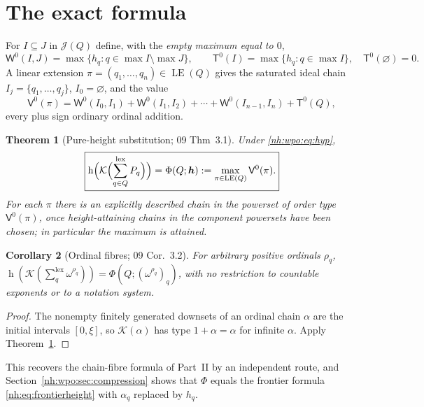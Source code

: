 \documentclass[11pt,a4paper]{article}
\newtheorem{theorem}{Theorem}[section]
\newtheorem{corollary}[theorem]{Corollary}
\theoremstyle{definition}
\theoremstyle{remark}
\newcommand{\K}{\mathcal K}
\newcommand{\hgt}{\operatorname{h}}
\newcommand{\lxs}{\mathop{\sum}\limits^{\mathrm{lex}}}
\newcommand{\J}{\mathcal J}
\newcommand{\LE}{\operatorname{LE}}
\newcommand{\Wz}{\mathsf W^{0}}
\newcommand{\Tz}{\mathsf T^{0}}
\newcommand{\Vz}{\mathsf V^{0}}
\newcommand{\lxsi}{\mathop{\textstyle\sum}\nolimits^{\mathrm{lex}}}
\begin{document}
\section{The exact formula}\label{nh:wpo:sec:statement}

For $I\subseteq J$ in $\J(Q)$ define, with the \emph{empty maximum equal to
$0$},
\begin{equation}\label{nh:wpo:eq:weight}
 \Wz(I,J)=\max\{h_q:q\in\max I\setminus\max J\},\qquad
 \Tz(I)=\max\{h_q:q\in\max I\},\quad \Tz(\varnothing)=0 .
\end{equation}
A linear extension $\pi=(q_1,\dots,q_n)\in\LE(Q)$ gives the saturated ideal
chain $I_j=\{q_1,\dots,q_j\}$, $I_0=\varnothing$, and the value
\begin{equation}\label{nh:wpo:eq:pathvalue}
 \Vz(\pi)=\Wz(I_0,I_1)+\Wz(I_1,I_2)+\cdots+\Wz(I_{n-1},I_n)+\Tz(Q),
\end{equation}
every plus sign ordinary ordinal addition.

\begin{theorem}[Pure-height substitution; 09 Thm~3.1]\label{nh:wpo:thm:main}
Under \eqref{nh:wpo:eq:hyp},
\begin{equation}\label{nh:wpo:eq:main}
 \boxed{\displaystyle
 \hgt\Bigl(\K\Bigl(\lxs_{q\in Q}P_q\Bigr)\Bigr)=\Phi(Q;\boldsymbol h)
 :=\max_{\pi\in\LE(Q)}\Vz(\pi).}
\end{equation}
For each $\pi$ there is an explicitly described chain in the powerset of order
type $\Vz(\pi)$, once height-attaining chains in the component powersets have
been chosen; in particular the maximum is attained.
\end{theorem}

\begin{corollary}[Ordinal fibres; 09 Cor.~3.2]\label{nh:wpo:cor:ordinal}
For arbitrary positive ordinals $\rho_q$,
$\hgt(\K(\lxsi_q\omega^{\rho_q}))=\Phi(Q;(\omega^{\rho_q})_q)$, with no
restriction to countable exponents or to a notation system.
\end{corollary}
\begin{proof}
The nonempty finitely generated downsets of an ordinal chain $\alpha$ are the
initial intervals $[0,\xi]$, so $\K(\alpha)$ has type $1+\alpha=\alpha$ for
infinite $\alpha$. Apply Theorem~\ref{nh:wpo:thm:main}.
\end{proof}

This recovers the chain-fibre formula of Part~II by an independent route, and
Section~\ref{nh:wpo:sec:compression} shows that $\Phi$ equals the frontier
formula \eqref{nh:eq:frontierheight} with $\alpha_q$ replaced by $h_q$.
\end{document}
